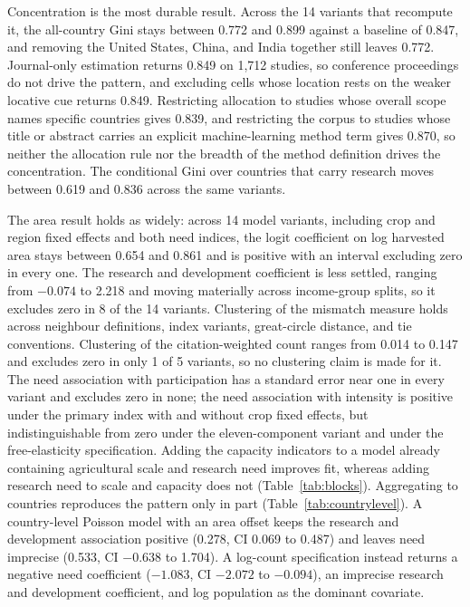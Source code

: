 \documentclass[ASNA,twocolumn]{USG}
\begin{document}
Concentration is the most durable result. Across the 14 variants that recompute it, the
all-country Gini stays between 0.772 and 0.899 against a baseline of 0.847, and removing the
United States, China, and India together still leaves 0.772. Journal-only estimation returns
0.849 on 1,712 studies, so conference proceedings do not drive the pattern, and excluding
cells whose location rests on the weaker locative cue returns 0.849. Restricting allocation
to studies whose overall scope names specific countries gives 0.839, and restricting the
corpus to studies whose title or abstract carries an explicit machine-learning method term
gives 0.870, so neither the allocation rule nor the breadth of the method definition drives
the concentration. The conditional Gini over countries that carry research moves between
0.619 and 0.836 across the same variants.

The area result holds as widely: across 14 model variants, including crop and region fixed
effects and both need indices, the logit coefficient on log harvested area stays between 0.654
and 0.861 and is positive with an interval excluding zero in every one. The research and
development coefficient is less settled, ranging from $-0.074$ to 2.218 and moving materially
across income-group splits, so it excludes zero in 8 of the 14 variants. Clustering of the
mismatch measure holds across neighbour definitions, index variants, great-circle distance, and
tie conventions. Clustering of the citation-weighted count ranges from 0.014 to 0.147 and
excludes zero in only 1 of 5 variants, so no clustering claim is made for it. The need
association with participation has a standard error near one in every variant and excludes zero
in none; the need association with intensity is positive under the primary index with and without crop
fixed effects, but indistinguishable from zero under the eleven-component variant and under the
free-elasticity specification. Adding the capacity indicators to a model already containing agricultural scale and research
need improves fit, whereas adding research need to scale and capacity does not
(Table~\ref{tab:blocks}). Aggregating to countries reproduces the pattern only in part
(Table~\ref{tab:countrylevel}). A
country-level Poisson model with an area offset keeps the research and development association
positive (0.278, CI 0.069 to 0.487) and leaves need imprecise (0.533, CI $-0.638$ to 1.704). A
log-count specification instead returns a negative need coefficient (\(-1.083\), CI $-2.072$ to
$-0.094$), an imprecise research and development coefficient, and log population as the dominant
covariate.
\end{document}
